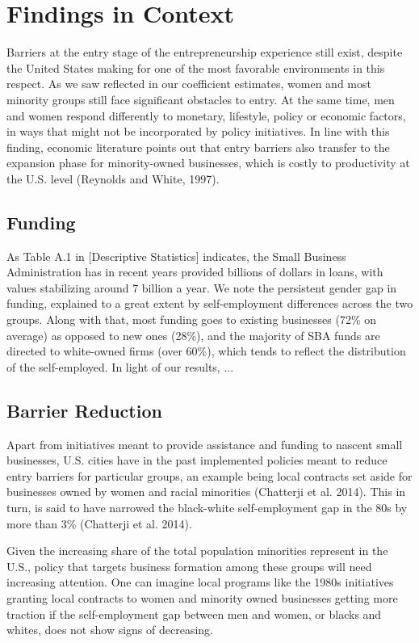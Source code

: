 \section{Findings in Context}

Barriers at the entry stage of the entrepreneurship experience still exist, despite the United States making for one of the most favorable environments in this respect. As we saw reflected in our coefficient estimates, women and most minority groups still face significant obstacles to entry. At the same time, men and women respond differently to monetary, lifestyle, policy or economic factors, in ways that might not be incorporated by policy initiatives. In line with this finding, economic literature points out that entry barriers also transfer to the expansion phase for minority-owned businesses, which is costly to productivity at the U.S. level (Reynolds and White, 1997). 

\subsection{Funding}

As Table A.1 in [Descriptive Statistics] indicates, the Small Business Administration has in recent years provided billions of dollars in loans, with values stabilizing around 7 billion a year. We note the persistent gender gap in funding, explained to a great extent by self-employment differences across the two groups. Along with that, most funding goes to existing businesses (72\% on average) as opposed to new ones (28\%), and the majority of SBA funds are directed to white-owned firms (over 60\%), which tends to reflect the distribution of the self-employed. In light of our results, ... 

\subsection{Barrier Reduction}

Apart from initiatives meant to provide assistance and funding to nascent small businesses, U.S. cities have in the past implemented policies meant to reduce entry barriers for particular groups, an example being local contracts set aside for businesses owned by women and racial minorities (Chatterji et al. 2014). This in turn, is said to have narrowed the black-white self-employment gap in the 80s by more than 3\% (Chatterji et al. 2014).

Given the increasing share of the total population minorities represent in the U.S., policy that targets business formation among these groups will need increasing attention. One can imagine local programs like the 1980s initiatives granting local contracts to women and minority owned businesses getting more traction if the self-employment gap between men and women, or blacks and whites, does not show signs of decreasing.  

